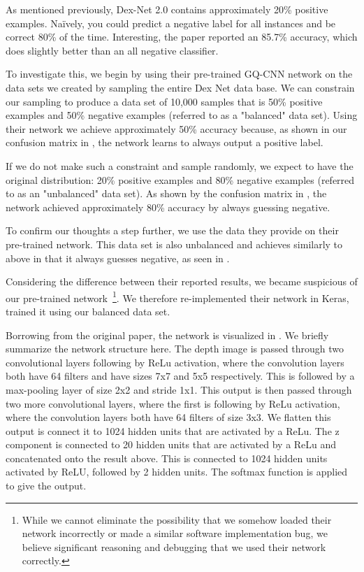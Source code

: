 As mentioned previously, Dex-Net 2.0 contains approximately 20\% positive examples. 
Na{\"i}vely, you could predict a negative label for all instances and be correct 80\% of the time. 
Interesting, the paper reported an 85.7\% accuracy, which does slightly better than an all negative classifier. 

To investigate this, we begin by using their pre-trained GQ-CNN network  on the data sets we created by sampling the entire Dex Net data base. 
We can constrain our sampling to produce a data set of 10,000 samples that is 50\% positive examples and 50\% negative examples (referred to as a "balanced" data set). 
Using their network we achieve approximately 50\% accuracy because, as shown in our confusion matrix in , the network learns to always output a positive label. 

If we do not make such a constraint and sample randomly, we expect to have the original distribution: 20\% positive examples and 80\% negative examples (referred to as an "unbalanced" data set). 
As shown by the confusion matrix in , the network achieved approximately 80\% accuracy by always guessing negative. 

To confirm our thoughts a step further, we use the data they provide on their pre-trained network. 
This data set is also unbalanced and achieves similarly to above in that it always guesses negative, as seen in . 

Considering the difference between their reported results, we became suspicious of our pre-trained network~\footnote{While we cannot eliminate the possibility that we somehow loaded their network incorrectly or made a similar software implementation bug, we believe significant reasoning and debugging that we used their network correctly.}.
We therefore re-implemented their network in Keras, trained it using our balanced data set. 

Borrowing from the original paper, the network is visualized in . 
We briefly summarize the network structure here. 
The depth image is passed through two convolutional layers following by ReLu activation, where the convolution layers both have 64 filters and have sizes 7x7 and 5x5 respectively. 
This is followed by a max-pooling layer of size 2x2 and stride 1x1. 
This output is then passed through two more convolutional layers, where the first is following by ReLu activation, where the convolution layers both have 64 filters of size 3x3. 
We flatten this output is connect it to 1024 hidden units that are activated by a ReLu. 
The z component is connected to 20 hidden units that are activated by a ReLu and concatenated onto the result above. 
This is connected to 1024 hidden units activated by ReLU, followed by 2 hidden units. 
The softmax function is applied to give the output. 

